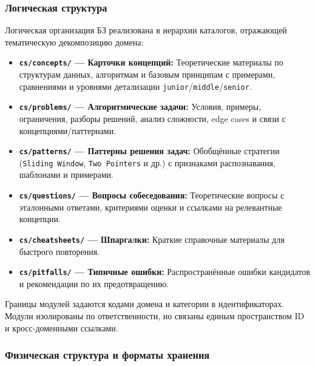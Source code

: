 \subsubsection*{Логическая структура}


Логическая организация БЗ реализована в иерархии каталогов, отражающей тематическую декомпозицию домена:

\begin{itemize}
    \item \textbf{\texttt{cs/concepts/} — Карточки концепций:} Теоретические материалы по структурам данных, алгоритмам и базовым принципам с примерами, сравнениями и уровнями детализации \texttt{junior}/\texttt{middle}/\texttt{senior}.
    
    \item \textbf{\texttt{cs/problems/} — Алгоритмические задачи:} Условия, примеры, ограничения, разборы решений, анализ сложности, edge cases и связи с концепциями/паттернами.
    
    \item \textbf{\texttt{cs/patterns/} — Паттерны решения задач:} Обобщённые стратегии (\texttt{Sliding Window}, \texttt{Two Pointers} и др.) с признаками распознавания, шаблонами и примерами.
    
    \item \textbf{\texttt{cs/questions/} — Вопросы собеседования:} Теоретические вопросы с эталонными ответами, критериями оценки и ссылками на релевантные концепции.
    
    \item \textbf{\texttt{cs/cheatsheets/} — Шпаргалки:} Краткие справочные материалы для быстрого повторения.
    
    \item \textbf{\texttt{cs/pitfalls/} — Типичные ошибки:} Распространённые ошибки кандидатов и рекомендации по их предотвращению.
\end{itemize}

Границы модулей задаются кодами домена и категории в идентификаторах. Модули изолированы по ответственности, но связаны единым пространством ID и кросс-доменными ссылками.

\subsubsection*{Физическая структура и форматы хранения}

